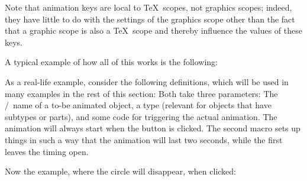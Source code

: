 \begin{command}{\pgfsys@animate{}}
\begin{enumerate}
            Note that animation keys are local to \TeX\ scopes, not graphics
            scopes; indeed, they have little to do with the settings of the
            graphics scope other than the fact that a graphic scope is also a
            \TeX\ scope and thereby influence the values of these keys.
    \end{enumerate}

    A typical example of how all of this works is the following:
\begin{codeexample}
\pgfsysanimkeyrepeatindefinite %
{
  \pgfsysanimkeywhom{\someid}{}%
}
{
  \pgfsysanimkeywhom{\someid}{}%
  \pgfsysanimvalcurrent %
  \pgfsysanimvaldimension{5pt} %
}
\end{codeexample}
    As a real-life example, consider the following definitions, which will be
    used in many examples in the rest of this section: Both take three
    parameters: The \pgfname/\tikzname\ name of a to-be animated object, a type
    (relevant for objects that have subtypes or parts), and some code for
    triggering the actual animation. The animation will always start when the
    button is clicked. The second macro sets up things in such a way that the
    animation will last two seconds, while the first leaves the timing open.
\begin{codeexample}
\def\animationexample#1#2#3{
  \tikz[fill=blue!25, draw=blue, ultra thick] {
    \pgfidrefnextuse{\objid}{#1}
    \pgfsysanimkeywhom{\objid}{#2}
    \pgfidrefnextuse{\nodeid}{node}
    \pgfsysanimkeyevent{\nodeid}{}{click}{}{begin}
    #3
    \node [font=\scriptsize, circle, fill, draw, align=center]
      (node) {Click \\ here};
  }
}
\end{codeexample}
    Now the example, where the circle will disappear, when clicked:
\begin{codeexample}[
    preamble={\usetikzlibrary{animations}},
    animation list={0.5,1,1.5,2}]
\end{codeexample}
\end{command}

